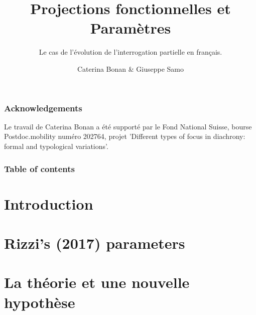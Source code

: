 \documentclass[aspectratio=169, sectionpages, codemintedoverleaf, bibref]{beamer}
\title{Projections fonctionnelles et Paramètres}
\subtitle{Le cas de l'évolution de l'interrogation partielle en français.}
\author{Caterina Bonan \& Giuseppe Samo}
\institute{University of Cambridge; Université de Genève \& BLCU.}
\begin{document}
\titlepage

\begin{frame}
    \frametitle{Acknowledgements}
    \begin{center}
        Le travail de Caterina Bonan a été supporté par le Fond National Suisse, bourse Postdoc.mobility numéro 202764, projet 'Different types of focus in diachrony: formal and typological variations'.
    \end{center}
\end{frame}

\begin{frame}
	\frametitle{Table of contents}
	\tableofcontents
\end{frame}

\section{Introduction}



\section{Rizzi's (2017) parameters}




\section{La théorie et une nouvelle hypothèse}


\end{document}
